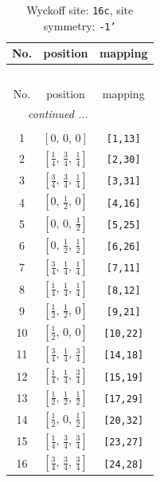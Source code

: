 \documentclass[fleqn,8pt]{jsarticle}
\begin{document}
\begin{longtable}{ccc}
\caption{Wyckoff site: {\tt 16c}, site symmetry: {\tt -1'}}
 \\
 \hline \hline
No. & position & mapping \\ \hline \endfirsthead

\multicolumn{2}{l}{\tablename\ \thetable{}} \\
 \hline \hline
No. & position & mapping \\ \hline \endhead

 \hline \hline
\multicolumn{2}{r}{\footnotesize\it continued ...} \\ \endfoot

 \hline \hline
\multicolumn{2}{r}{} \\ \endlastfoot

1 & $\left[ 0,\, 0,\, 0 \right]$ & {\tt [1,13]} \\ \hline
2 & $\left[ \frac{1}{4},\, \frac{3}{4},\, \frac{1}{4} \right]$ & {\tt [2,30]} \\ \hline
3 & $\left[ \frac{3}{4},\, \frac{3}{4},\, \frac{1}{4} \right]$ & {\tt [3,31]} \\ \hline
4 & $\left[ 0,\, \frac{1}{2},\, 0 \right]$ & {\tt [4,16]} \\ \hline
5 & $\left[ 0,\, 0,\, \frac{1}{2} \right]$ & {\tt [5,25]} \\ \hline
6 & $\left[ 0,\, \frac{1}{2},\, \frac{1}{2} \right]$ & {\tt [6,26]} \\ \hline
7 & $\left[ \frac{3}{4},\, \frac{1}{4},\, \frac{1}{4} \right]$ & {\tt [7,11]} \\ \hline
8 & $\left[ \frac{1}{4},\, \frac{1}{4},\, \frac{1}{4} \right]$ & {\tt [8,12]} \\ \hline
9 & $\left[ \frac{1}{2},\, \frac{1}{2},\, 0 \right]$ & {\tt [9,21]} \\ \hline
10 & $\left[ \frac{1}{2},\, 0,\, 0 \right]$ & {\tt [10,22]} \\ \hline
11 & $\left[ \frac{3}{4},\, \frac{1}{4},\, \frac{3}{4} \right]$ & {\tt [14,18]} \\ \hline
12 & $\left[ \frac{1}{4},\, \frac{1}{4},\, \frac{3}{4} \right]$ & {\tt [15,19]} \\ \hline
13 & $\left[ \frac{1}{2},\, \frac{1}{2},\, \frac{1}{2} \right]$ & {\tt [17,29]} \\ \hline
14 & $\left[ \frac{1}{2},\, 0,\, \frac{1}{2} \right]$ & {\tt [20,32]} \\ \hline
15 & $\left[ \frac{1}{4},\, \frac{3}{4},\, \frac{3}{4} \right]$ & {\tt [23,27]} \\ \hline
16 & $\left[ \frac{3}{4},\, \frac{3}{4},\, \frac{3}{4} \right]$ & {\tt [24,28]} \\
\end{longtable}
\end{document}
